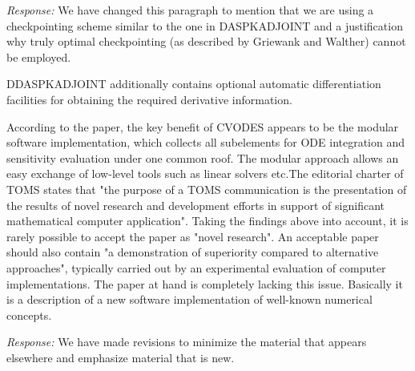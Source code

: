 {\em Response:}
We have changed this paragraph to mention that we are 
using a checkpointing scheme similar to the one in DASPKADJOINT
and a justification why truly optimal checkpointing (as described
by Griewank and Walther) cannot be employed.

DDASPKADJOINT additionally contains optional automatic differentiation
facilities for obtaining the required derivative information.

According to the paper, the key benefit of CVODES appears to be the
modular software implementation, which collects all subelements for
ODE integration and sensitivity evaluation under one common roof. The
modular approach allows an easy exchange of low-level tools such as
linear solvers etc.The editorial charter of TOMS states that "the
purpose of a TOMS communication is the presentation of the results of
novel research and development efforts in support of significant
mathematical computer application". Taking the findings above into
account, it is rarely possible to accept the paper as "novel
research". An acceptable paper should also contain "a demonstration of
superiority compared to alternative approaches", typically carried out
by an experimental evaluation of computer implementations.  The paper
at hand is completely lacking this issue. Basically it is a
description of a new software implementation of well-known numerical
concepts.

{\em Response:}
We have made revisions to minimize the material that appears elsewhere
and emphasize material that is new.


